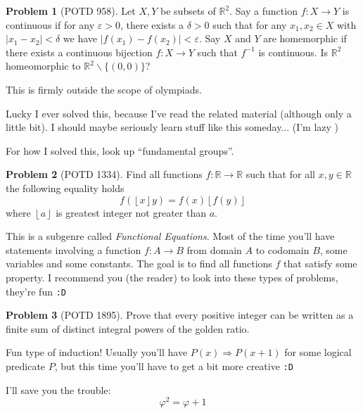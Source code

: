 \documentclass[11pt]{article} %
\theoremstyle{definition}
\newtheorem{problem}{Problem}
\theoremstyle{remark}
\begin{document}
\begin{problem}[POTD 958]
    Let \(X, Y\) be subsets of \(\mathbb{R}^2\). Say a function \(f : X \to Y\) is continuous if for any \(\varepsilon > 0\), there exists a \(\delta > 0\) such that for any \(x_1, x_2 \in X\) with \(|x_1 - x_2| < \delta\) we have \(|f(x_1) - f(x_2)| < \varepsilon\). Say \(X\) and \(Y\) are homemorphic if there exists a continuous bijection \(f : X \to Y\) such that \(f^{-1}\) is continuous. Is \(\mathbb{R}^2\) homeomorphic to \(\mathbb{R}^2 \backslash \{(0,0)\}\)?
    \begin{talks}
        \begin{talk}
            This is firmly outside the scope of olympiads.
        \end{talk}
        \begin{talk}
            Lucky I ever solved this, because I've read the related material (although only a little bit). I should maybe seriously learn stuff like this someday... (I'm lazy )
        \end{talk}
        \begin{talk}
            For how I solved this, look up ``fundamental groups''.
        \end{talk}
    \end{talks}
\end{problem}

\begin{problem}[POTD 1334]
    Find all functions \(f:\mathbb{R}\rightarrow\mathbb{R}\) such that for all \(x,y\in\mathbb{R}\) the following equality holds \[ f(\left\lfloor x\right\rfloor y)=f(x)\left\lfloor f(y)\right\rfloor \] where \(\left\lfloor a\right\rfloor \) is greatest integer not greater than \(a\).
    \begin{talks}
        \begin{talk}
            This is a subgenre called \emph{Functional Equations}. Most of the time you'll have statements involving a function \(f: A \rightarrow B\) from domain \(A\) to codomain \(B\), some variables and some constants. The goal is to find all functions \(f\) that satisfy some property. I recommend you (the reader) to look into these types of problems, they're fun \texttt{:D}
        \end{talk}
    \end{talks}
\end{problem}

\begin{problem}[POTD 1895]
    Prove that every positive integer can be written as a finite sum of distinct integral powers of the golden ratio.
    \begin{talks}
        \begin{talk}
            Fun type of induction! Usually you'll have \(P(x) \Rightarrow P(x+1)\) for some logical predicate \(P\), but this time you'll have to get a bit more creative \texttt{:D}
        \end{talk}
        \begin{talk}
            I'll save you the trouble:
            \[\varphi^2 = \varphi + 1\]
        \end{talk}
    \end{talks}
\end{problem}
\end{document}
